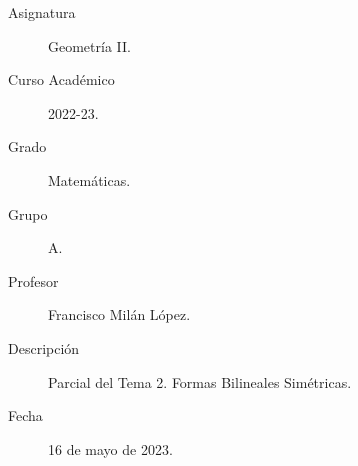\documentclass[12pt]{article}
\begin{document}

    
    

    \begin{description}
        \item[Asignatura] Geometría II.
        \item[Curso Académico] 2022-23.
        \item[Grado] Matemáticas.
        \item[Grupo] A.
        \item[Profesor] Francisco Milán López.
        \item[Descripción] Parcial del Tema 2. Formas Bilineales Simétricas.
        \item[Fecha] 16 de mayo de 2023.
    
    \end{description}
    \newpage
    
\end{document}
